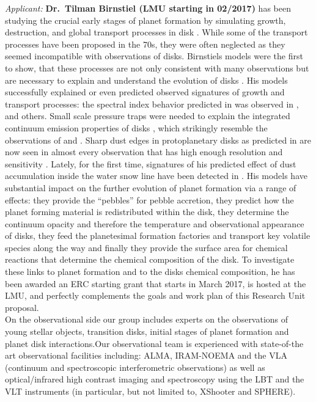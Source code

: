 \documentclass[10pt,fleqn,twoside,a4paper]{article}
\begin{document}
\textit{Applicant:} \textbf{Dr.\ Tilman Birnstiel (LMU starting in 02/2017)} has been
studying the crucial early stages of planet formation by simulating growth,
destruction, and global transport processes in disk
\citep[e.g.][]{2010A&A...513A..79B}. While some of the transport processes have
been proposed in the 70s, they were often neglected as they seemed incompatible
with observations of disks. Birnstiels models were the first to show, that these
processes are not only consistent with many observations but are necessary to
explain and understand the evolution of disks \citep{2010A&A...516L..14B}. His
models successfully explained or even predicted observed signatures of growth
and transport processes: the spectral index behavior predicted in
\citet{2010A&A...516L..14B} was observed in \citet{2012ApJ...760L..17P},
\citet{2016A&A...588A..53T} and others. Small scale pressure traps were needed
to explain the integrated continuum emission properties of disks
\citep{2012A&A...538A.114P}, which strikingly resemble the observations of
\citet{2015ApJ...808L...3A} and \citet{2016ApJ...820L..40A}. Sharp dust edges in
protoplanetary disks as predicted in \citet{2014ApJ...780..153B} are now seen in
almost every observation that has high enough resolution and sensitivity
\citep[e.g.][]{2016ApJ...820L..40A,2013A&A...557A.133D}. Lately, for the first
time, signatures of his predicted effect of dust accumulation inside the water
snow line \citet{2010A&A...513A..79B} have been detected in
\citet{2016Natur.535..258C}. His models have substantial impact on the further
evolution of planet formation via a range of effects: they provide the
``pebbles'' for pebble accretion, they predict how the planet forming material
is redistributed within the disk, they determine the continuum opacity and
therefore the temperature and observational appearance of disks, they feed the
planetesimal formation factories and transport key volatile species along the
way and finally they provide the surface area for chemical reactions that determine the
chemical composition of the disk. To investigate these links to planet formation
and to the disks chemical composition, he has been awarded an ERC starting grant
that starts in March 2017, is hosted at the LMU, and perfectly complements
the goals and work plan of this Research Unit proposal.\\

 On the observational side our group includes experts on the
 observations of young stellar objects, transition disks, initial stages of
 planet formation and planet disk interactions.Our observational team
 is experienced with state-of-the art observational facilities
 including: ALMA, IRAM-NOEMA and the VLA (continuum and spectroscopic
 interferometric observations) as well as optical/infrared high
 contrast imaging and spectroscopy using the LBT and the VLT
 instruments (in particular, but not limited to, XShooter and
 SPHERE).\\ 
\end{document}
